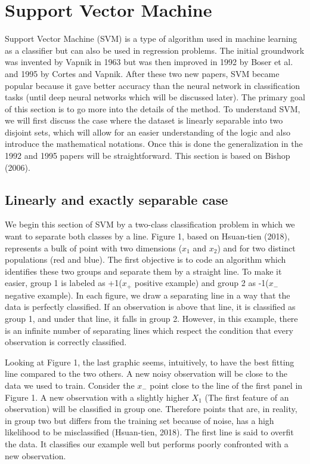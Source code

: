 \documentclass[a4paper,12pt]{article}
\numberwithin{equation}{section}
\begin{document}
\newpage

\section{Support Vector Machine}\label{sec:first}


Support Vector Machine (SVM) is a type of algorithm used in machine learning as a classifier but can also be used in regression problems. The initial groundwork was invented by Vapnik in 1963 but was then improved in 1992 by Boser et al. and 1995 by Cortes and Vapnik. After these two new papers, SVM became popular because it gave better accuracy than the neural network in classification tasks (until deep neural networks which will be discussed later). The primary goal of this section is to go more into the details of the method. To understand SVM, we will first discuss the case where the dataset is linearly separable into two disjoint sets, which will allow for an easier understanding of the logic and also introduce the mathematical notations. Once this is done the generalization in the 1992 and 1995 papers will be straightforward. This section is based on Bishop (2006).


\subsection{Linearly and exactly separable case}

We begin this section of SVM by a two-class classification problem in which we want to separate both classes by a line. Figure 1, based on Hsuan-tien (2018), represents a bulk of point with two dimensions ($x_1$ and $x_2$) and for two distinct populations (red and blue). The first objective is to code an algorithm which identifies these two groups and separate them by a straight line. To make it easier, group 1 is labeled as +1($x_+$ positive example) and group 2 as -1($x_-$ negative example). In each figure, we draw a separating line in a way that the data is perfectly classified. If an observation is above that line, it is classified as group 1, and under that line, it falls in group 2. However, in this example, there is an infinite number of separating lines which respect the condition that every observation is correctly classified. \par
Looking at Figure 1, the last graphic seems, intuitively, to have the best fitting line compared to the two others. A new noisy observation will be close to the data we used to train. Consider the $x_-$ point close to the line of the first panel in Figure 1. A new observation with a slightly higher $X_1$ (The first feature of an observation) will be classified in group one. Therefore points that are, in reality, in group two but differs from the training set because of noise, has a high likelihood to be misclassified (Hsuan-tien, 2018). The first line is said to overfit the data. It classifies our example well but performs poorly confronted with a new observation. 
\end{document}
